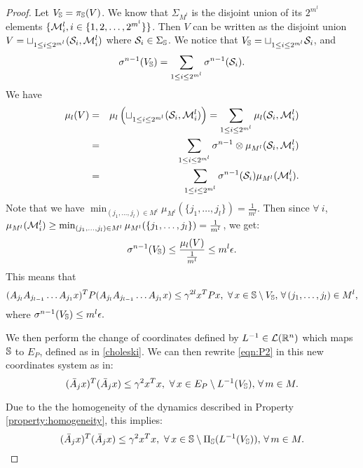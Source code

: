 \begin{proof}
Let $V_{\mathbb{S}} = \pi_{\mathbb{S}}(V)$. We know that $\Sigma_{M^l}$ is the disjoint union of its $2^{m^l}$ elements $\{\mathcal{M}^l_i, i \in \{1,2, \dots, 2^{m^l} \} \}$. Then $V$ can be written as the disjoint union $V = \sqcup_{1 \leq i \leq 2^{m^l}} (\mathcal{S}_i, \mathcal{M}^l_i)$ where $\mathcal{S}_i \in \Sigma_{\mathbb{S}}$. We notice that 
$V_{\mathbb{S}} = \sqcup_{1 \leq i \leq 2^{m^l}} \mathcal{S}_i$, 
and
\begin{equation*}
\sigma^{n-1} (V_{\mathbb{S}}) = \sum_{1 \leq i \leq 2^{m^l}} \sigma^{n-1} (\mathcal{S}_i).
\end{equation*}
We have 
\begin{eqnarray*}
\mu_l(V) &=& \mu_l \left( \sqcup_{1 \leq i \leq 2^{m^l}} (\mathcal{S}_i, \mathcal{M}^l_i) \right) = \sum_{1 \leq i \leq 2^{m^l}} \mu_l(\mathcal{S}_i, \mathcal{M}^l_i) \\
 &=& \sum_{1 \leq i \leq 2^{m^l}} \sigma^{n-1} \otimes \mu_{M^l} (\mathcal{S}_i, \mathcal{M}^l_i) \\
 & = &\sum_{1 \leq i \leq 2^{m^l}} \sigma^{n-1}(\mathcal{S}_i) \mu_{M^l} (\mathcal{M}^l_i).
\end{eqnarray*}
Note that we have $\min_{(j_1,\dots,j_l) \in M^l} \mu_{M^l}(\{j_1,\dots,j_l\}) = \frac{1}{m^l}.$ Then since $ \forall \ i$, $\mu_{M^l}(\mathcal{M}^l_i) \geq \min_{(j_1,\dots,j_l) \in M^l} \mu_{M^l}(\{j_1,\dots,j_l\}) = \frac{1}{m^l}$, we get:
\begin{equation}
\sigma^{n-1}(V_{\mathbb{S}}) \leq \frac{\mu_l(V)}{\frac{1}{m^l}} \leq m^l \epsilon.
\end{equation}
This means that 
\begin{equation}\label{eqn:P2}(A_{j_l} A_{j_{l-1}} \dots A_{j_1} x)^T P (A_{j_l} A_{j_{l-1}} \dots A_{j_1} x) \leq \gamma^{2l} x^T P x,\,\, \forall\, x \in \mathbb{S} \setminus V_{\mathbb{S}}, \,\forall\, (j_1,\dots,j_l) \in M^l,
\end{equation}
where $\sigma^{n-1}(V_{\mathbb{S}}) \leq m^l \epsilon.$

We then perform the change of coordinates defined by $L^{-1} \in \mathcal{L}(\mathbb{R}^n)$ which maps $\mathbb{S}$ to $E_P$, defined as in \eqref{choleski}. We can then rewrite
\eqref{eqn:P2} in this new coordinates system as in: 
\begin{equation}(\bar{A}_j x)^T(\bar{A}_j x) \leq {\gamma}^2x^Tx,\,\, \forall\, x \in E_P\setminus L^{-1}(V_{\mathbb{S}}), \,\forall\, m \in M.\end{equation}

Due to the  the homogeneity of the dynamics described in Property \ref{property:homogeneity}, this implies:
\begin{equation}\label{eqn:P}
(\bar{A}_j x)^T(\bar{A}_j x) \leq {\gamma}^2x^Tx,\,\, \forall\, x \in \mathbb{S}\setminus \Pi_{\mathbb{S}}(L^{-1}(V_{\mathbb{S}})), \,\forall\, m \in M.
\end{equation}


\end{proof}
